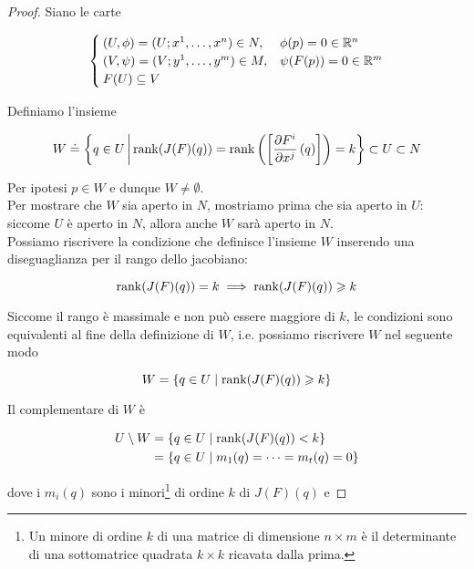 \begin{proof}
	Siano le carte
	
	\begin{equation}
		\begin{cases}
			(U,\phi) = (U; x^{1},\dots,x^{n}) \in N, & \phi(p) = 0 \in \mathbb{R}^{n} \\
			(V,\psi) = (V; y^{1},\dots,y^{m}) \in M, & \psi(F(p)) = 0  \in \mathbb{R}^{m} \\
			F(U) \subseteq V
		\end{cases}
	\end{equation}

	Definiamo l'insieme
	
	\begin{equation}
		W \doteq \left\{ q \in U \, \middle| \, \rank(J(F)(q)) = \rank \left( \left[ \pdv{F^{i}}{x^{j}} \, (q) \right] \right) = k \right\} \subset U \subset N
	\end{equation}

	Per ipotesi $ p \in W $ e dunque $ W \neq \emptyset $.\\
	Per mostrare che $ W $ sia aperto in $ N $, mostriamo prima che sia aperto in $ U $: siccome $ U $ è aperto in $ N $, allora anche $ W $ sarà aperto in $ N $.\\
	Possiamo riscrivere la condizione che definisce l'insieme $ W $ inserendo una diseguaglianza per il rango dello jacobiano:
	
	\begin{equation}
		\rank(J(F)(q)) = k %
		\implies %
		\rank(J(F)(q)) \geqslant k
	\end{equation}

	Siccome il rango è massimale e non può essere maggiore di $ k $, le condizioni sono equivalenti al fine della definizione di $ W $, i.e. possiamo riscrivere $ W $ nel seguente modo
	
	\begin{equation}
		W = \{ q \in U \mid \rank(J(F)(q)) \geqslant k \}
	\end{equation}

	Il complementare di $ W $ è
	
	\begin{align}
		\begin{split}
			U \setminus W &= \{ q \in U \mid \rank(J(F)(q)) < k \} \\
			&= \{ q \in U \mid m_{1}(q) = \cdots = m_{t}(q) = 0 \}
		\end{split}
	\end{align}

	dove i $ m_{i}(q) $ sono i minori\footnote{%
		Un minore di ordine $ k $ di una matrice di dimensione $ n \times m $ è il determinante di una sottomatrice quadrata $ k \times k $ ricavata dalla prima.%
	} di ordine $ k $ di $ J(F)(q) $ e
	

\end{proof}
